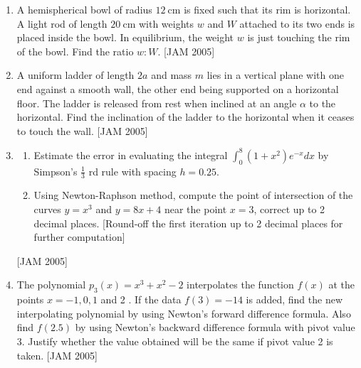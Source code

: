 \begin{enumerate}
\begin{enumerate}
    $$
        \int_{0}^{2 \pi}\left|f\left(r e^{i \theta}\right)\right| d \theta \leq \sqrt{r}
    $$

    Find $\frac{f^{(n)}(0)}{n !}$ for all $n \geq 0$

    \item Find all values of $\alpha \in C$ such that $f(z)=(z+\bar{z})^{2}+2 \alpha|z|^{2}+\alpha(\bar{z})^{2}$ is analytic at some point $z$ having non-zero real part. 
\end{enumerate}
 \hfill [JAM 2005]

 
\begin{center}
\textbf{OPTIONAL SECTION: D}
\end{center}


\item  A hemispherical bowl of radius $12 \mathrm{~cm}$ is fixed such that its rim is horizontal. A light rod of length $20 \mathrm{~cm}$ with weights $w$ and $W$ attached to its two ends is placed inside the bowl. In equilibrium, the weight $w$ is just touching the rim of the bowl. Find the ratio $w: W$.
 \hfill [JAM 2005]




\item  A uniform ladder of length $2 a$ and mass $m$ lies in a vertical plane with one end against a smooth wall, the other end being supported on a horizontal floor. The ladder is released from rest when inclined at an angle $\alpha$ to the horizontal. Find the inclination of the ladder to the horizontal when it ceases to touch the wall.
 \hfill [JAM 2005]




\item 
\begin{enumerate}
    \item Estimate the error in evaluating the integral $\int_{0}^{8}\left(1+x^{2}\right) e^{-x} d x$ by Simpson's $\frac{1}{3}$ rd rule with spacing $h=0.25$.

    \item Using Newton-Raphson method, compute the point of intersection of the curves $y=x^{3}$ and $y=8 x+4$ near the point $x=3$, correct up to 2 decimal places. [Round-off the first iteration up to 2 decimal places for further computation]
\end{enumerate}
 \hfill [JAM 2005]



 
\item  The polynomial $p_{3}(x)=x^{3}+x^{2}-2$ interpolates the function $f(x)$ at the points $x=-1,0,1$ and 2 . If the data $f(3)=-14$ is added, find the new interpolating polynomial by using Newton's forward difference formula. Also find $f(2.5)$ by using Newton's backward difference formula with pivot value 3. Justify whether the value obtained will be the same if pivot value 2 is taken.
 \hfill [JAM 2005]


\end{enumerate}

